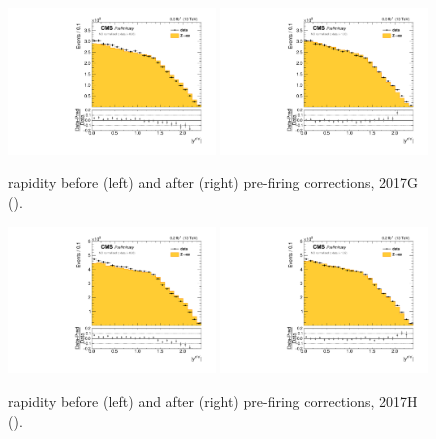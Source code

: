 \begin{figure}[htb]
\centering
\includegraphics[width=0.49\textwidth]{plots/Prefire/Zee5_Zrap_noPrefire.pdf}
\includegraphics[width=0.49\textwidth]{plots/Prefire/Zee5_Zrap_inclPrefire.pdf}
\caption{\zee rapidity before (left) and after (right) pre-firing corrections, 2017G (\sg).}
\label{fig:prefire:zrap:2017G}
\end{figure}

\begin{figure}[htb]
\includegraphics[width=0.49\textwidth]{plots/Prefire/Zee13_Zrap_noPrefire.pdf}
\includegraphics[width=0.49\textwidth]{plots/Prefire/Zee13_Zrap_inclPrefire.pdf}
\caption{\zee rapidity before (left) and after (right) pre-firing corrections, 2017H (\sh).}
\label{fig:prefire:zrap:2017H}
\end{figure}